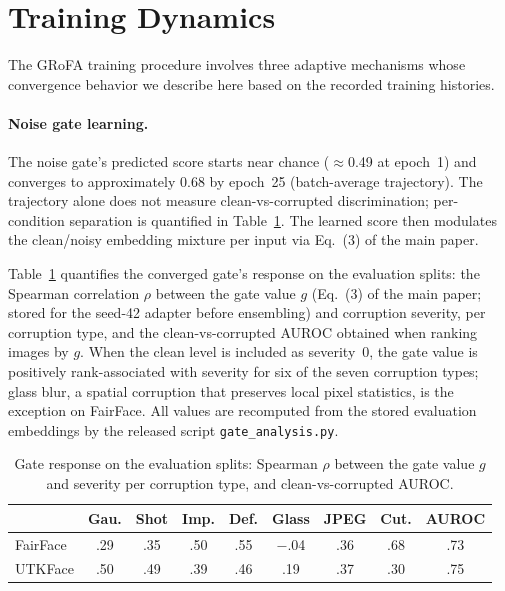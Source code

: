 
\section{Training Dynamics}
\label{app:training}

The GRoFA training procedure involves three adaptive mechanisms whose convergence behavior we describe here based on the recorded training histories.

\paragraph{Noise gate learning.}
The noise gate's predicted score starts near chance ($\approx$0.49 at epoch~1) and converges to approximately 0.68 by epoch~25 (batch-average trajectory).
The trajectory alone does not measure clean-vs-corrupted discrimination; per-condition separation is quantified in Table~\ref{tab:gate_response}.
The learned score then modulates the clean/noisy embedding mixture per input via Eq.~(3) of the main paper.

Table~\ref{tab:gate_response} quantifies the converged gate's response on the evaluation splits: the Spearman correlation $\rho$ between the gate value $g$ (Eq.~(3) of the main paper; stored for the seed-42 adapter before ensembling) and corruption severity, per corruption type, and the clean-vs-corrupted AUROC obtained when ranking images by $g$.
When the clean level is included as severity~0, the gate value is positively rank-associated with severity for six of the seven corruption types; glass blur, a spatial corruption that preserves local pixel statistics, is the exception on FairFace.
All values are recomputed from the stored evaluation embeddings by the released script \texttt{gate\_analysis.py}.

\begin{table}[htbp]
\centering
\caption{Gate response on the evaluation splits: Spearman $\rho$ between the gate value $g$ and severity per corruption type, and clean-vs-corrupted AUROC.}
\label{tab:gate_response}
\small
\setlength{\tabcolsep}{4pt}
\begin{tabular}{lccccccc c}
\toprule
 & Gau. & Shot & Imp. & Def. & Glass & JPEG & Cut. & AUROC \\
\midrule
FairFace & .29 & .35 & .50 & .55 & $-$.04 & .36 & .68 & .73 \\
UTKFace  & .50 & .49 & .39 & .46 & .19 & .37 & .30 & .75 \\
\bottomrule
\end{tabular}
\end{table}

